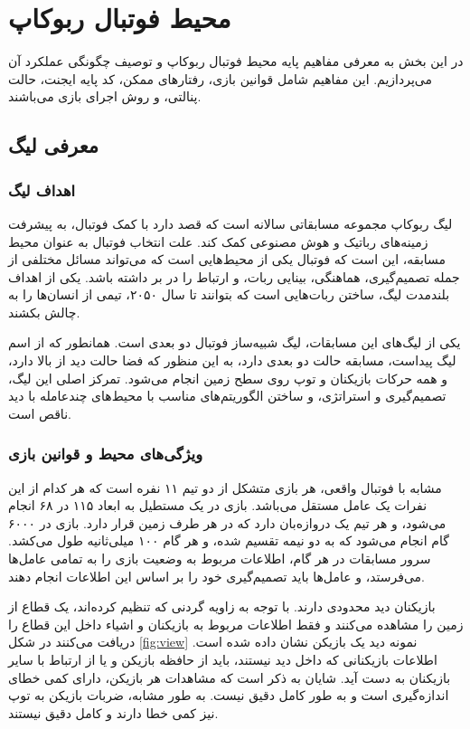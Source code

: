 \chapter{محیط فوتبال ربوکاپ}
در این بخش به معرفی مفاهیم پایه محیط فوتبال ربوکاپ و توصیف چگونگی عملکرد آن می‌پردازیم.
این مفاهیم شامل قوانین بازی، رفتار‌های ممکن، کد پایه ایجنت، حالت پنالتی، و روش اجرای بازی می‌باشند.
\section{معرفی لیگ}
\subsection{اهداف لیگ}
لیگ ربوکاپ مجموعه مسابقاتی سالانه است که قصد دارد با کمک فوتبال، به پیشرفت زمینه‌های رباتیک و هوش مصنوعی کمک کند.
علت انتخاب فوتبال به عنوان محیط مسابقه، این است که فوتبال یکی از محیط‌هایی است که می‌تواند مسائل مختلفی از جمله تصمیم‌گیری، هماهنگی، بینایی ربات، و ارتباط را در بر داشته باشد.
یکی از اهداف بلندمدت لیگ، ساختن ربات‌هایی است که بتوانند تا سال ۲۰۵۰، تیمی از انسان‌ها را به چالش بکشند.

یکی از لیگ‌های این مسابقات، لیگ شبیه‌ساز فوتبال دو بعدی است.
همانطور که از اسم لیگ پیداست، مسابقه حالت دو بعدی دارد، به این منظور که فضا حالت دید از بالا دارد، و همه حرکات بازیکنان و توپ روی سطح زمین انجام می‌شود.
تمرکز اصلی این لیگ، تصمیم‌گیری و استراتژی، و ساختن الگوریتم‌های مناسب با محیط‌های چند‌عامله با دید ناقص است.
\subsection{ویژگی‌های محیط و قوانین بازی}
مشابه با فوتبال واقعی، هر بازی متشکل از دو تیم ۱۱ نفره است که هر کدام از این نفرات یک عامل مستقل می‌باشد.
بازی در یک مستطیل به ابعاد ۱۱۵ در ۶۸ انجام می‌شود، و هر تیم یک دروازه‌بان دارد که در هر طرف زمین قرار دارد.
بازی در ۶۰۰۰ گام
 انجام می‌شود که به دو نیمه تقسیم‌ شده، و هر گام ۱۰۰ میلی‌ثانیه طول می‌کشد. سرور مسابقات در هر گام، اطلاعات مربوط به وضعیت بازی را به تمامی عامل‌ها می‌فرستد، و عامل‌ها باید تصمیم‌گیری خود را بر اساس این اطلاعات انجام دهند.

بازیکنان دید محدودی دارند. با توجه به زاویه گردنی که تنظیم کرده‌اند، یک قطاع از زمین را مشاهده می‌کنند و فقط اطلاعات مربوط به بازیکنان و اشیاء داخل این قطاع را دریافت می‌کنند در شکل \ref{fig:view} نمونه دید یک بازیکن نشان داده شده است.
اطلاعات بازیکنانی که داخل دید نیستند، باید از حافظه بازیکن و یا از ارتباط با سایر بازیکنان به دست آید.
شایان به ذکر است که مشاهدات هر بازیکن، دارای کمی خطای اندازه‌گیری است و به طور کامل دقیق نیست. به طور مشابه، ضربات بازیکن به توپ نیز کمی خطا دارند و کامل دقیق نیستند.

